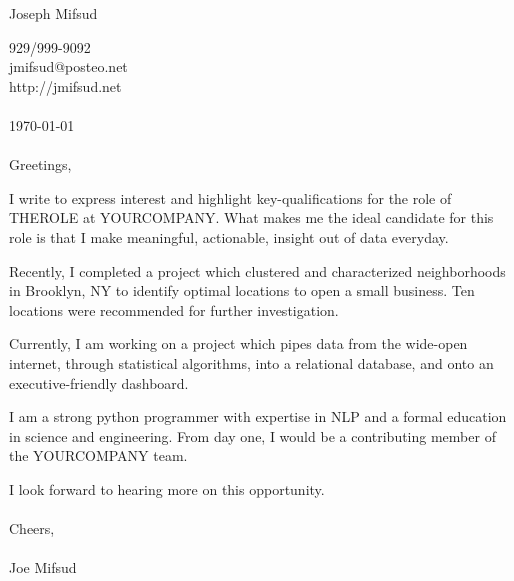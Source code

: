\documentclass{letter}
\begin{document}
\begin{huge}
\noindent Joseph Mifsud\\
\end{huge}
\begin{large}
929/999-9092\\
jmifsud@posteo.net\\
http://jmifsud.net\\
\\
\today
\\
\\
Greetings,

I write to express interest and highlight key-qualifications for the role of THEROLE at YOURCOMPANY. What makes me the ideal candidate for this role is that I make meaningful, actionable, insight out of data everyday.

Recently, I completed a project which clustered and characterized neighborhoods in Brooklyn, NY to identify optimal locations to open a small business. Ten locations were recommended for further investigation.

Currently, I am working on a project which pipes data from the wide-open internet, through statistical algorithms, into a relational database, and onto an executive-friendly dashboard.

I am a strong python programmer with expertise in NLP and a formal education in science and engineering. From day one, I would be a contributing member of the YOURCOMPANY team.

I look forward to hearing more on this opportunity.\\
\\
Cheers,\\
\\
Joe Mifsud
\end{large}
\end{document}
